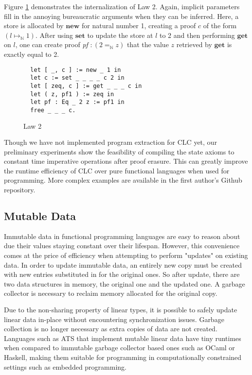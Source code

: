 \documentclass[sigplan,screen,review,authordraft]{acmart}
\theoremstyle{definition}
\newcommand{\new}{\textbf{new}}
\newcommand{\get}{\textbf{get}}
\newcommand{\set}{\textbf{set}}
\begin{document}
  Figure \ref{law2} demonstrates the internalization of Law 2. Again, implicit parameters fill in the annoying bureaucratic arguments when they can be inferred. Here, a store is allocated by $\new$ for natural number 1, creating a proof $c$ of the form $(l \mapsto_\mathbb{N} 1)$. After using $\set$ to update the store at $l$ to 2 and then performing $\get$ on $l$, one can create proof \textit{pf} $: (2 =_\mathbb{N} z)$ that the value $z$ retrieved by $\get$ is exactly equal to 2.

  \begin{figure}[h]
  \vspace{-0.6em}
  \caption{Law 2}
  \begin{lstlisting}
  let [ _, c ] := new _ 1 in
  let c := set _ _ _ _ c 2 in
  let [ zeq, c ] := get _ _ _ c in
  let ( z, pf1 ) := zeq in
  let pf : Eq _ 2 z := pf1 in
  free _ _ _ c.
  \end{lstlisting}
  \vspace{-0.6em}
  \label{law2}
  \Description{}
  \end{figure}

  Though we have not implemented program extraction for CLC yet, our preliminary experiments show the feasibility of compiling the state axioms to constant time imperative operations after proof erasure. This can greatly improve the runtime efficiency of CLC over pure functional languages when used for programming. More complex examples are available in the first author's Github repository.

  \subsection{Mutable Data}
  Immutable data in functional programming languages are easy to reason about due their values staying constant over their lifespan. However, this convenience comes at the price of efficiency when attempting to perform "updates" on existing data. In order to update immutable data, an entirely new copy must be created with new entries substituted in for the original ones. So after update, there are two data structures in memory, the original one and the updated one. A garbage collector is necessary to reclaim memory allocated for the original copy.

  Due to the non-sharing property of linear types, it is possible to safely update linear data in-place without encountering synchronization issues. Garbage collection is no longer necessary as extra copies of data are not created. Languages such as ATS that implement mutable linear data have tiny runtimes when compared to immutable garbage collector based ones such as OCaml or Haskell, making them suitable for programming in computationally constrained settings such as embedded programming.
\end{document}
